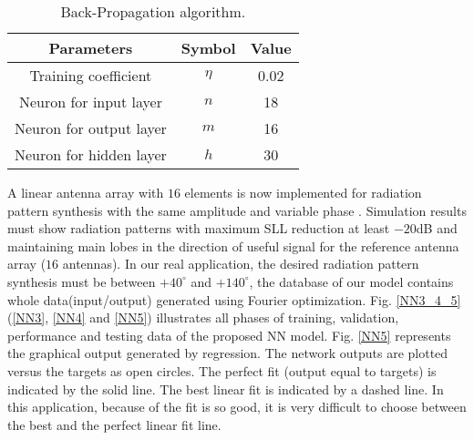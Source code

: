\documentclass[conference]{IEEEtran}
\begin{document}
\begin{table}[!ht]
\caption{Back-Propagation algorithm.}
\begin{center}
\renewcommand{\arraystretch}{1}
\small{
\begin{tabular}{|l|l|l|}
\hline
\multicolumn{1}{|c|}{\textbf{Parameters}} & \multicolumn{1}{c|}{\textbf{Symbol}} & \multicolumn{1}{c|}{\textbf{Value}} \\ 
\hline
\multicolumn{1}{|c|}{Training coefficient } & \multicolumn{1}{c|}{$\eta$} & \multicolumn{1}{c|}{0.02} \\ 
\hline
\multicolumn{1}{|c|}{Neuron for input layer} & \multicolumn{1}{c|}{$n$} & \multicolumn{1}{c|}{18} \\ 
\hline
\multicolumn{1}{|c|}{Neuron for output layer} & \multicolumn{1}{c|}{$m$} & \multicolumn{1}{c|}{16} \\ 
\hline
\multicolumn{1}{|c|}{Neuron for hidden layer} & \multicolumn{1}{c|}{$h$} & \multicolumn{1}{c|}{30} \\ 
\hline

\end{tabular}

}
\label{tab2}
\end{center}
\end{table}



A linear antenna array with $16$ elements is now implemented for radiation pattern synthesis with the same amplitude and variable phase \cite{a17}. Simulation results must show radiation patterns with maximum SLL reduction at least $-20$dB and maintaining main lobes in the direction of useful signal for the reference antenna array ($16$ antennas). In our real application, the desired radiation pattern synthesis must be between $+40^\circ$ and $+140^\circ$, the database of our model contains whole data(input/output) generated using Fourier optimization. Fig. \ref{NN3_4_5} (\ref{NN3}, \ref{NN4} and \ref{NN5}) illustrates all phases of training, validation, performance and testing data of the proposed NN model. Fig. \ref{NN5} represents the graphical output generated by regression. The network outputs are plotted versus the targets as open circles. The perfect fit (output equal to targets) is indicated by the solid line. The best linear fit is indicated by a dashed line. In this application, because of the fit is so good, it is very difficult to choose between the best and the perfect linear fit line.
\end{document}
